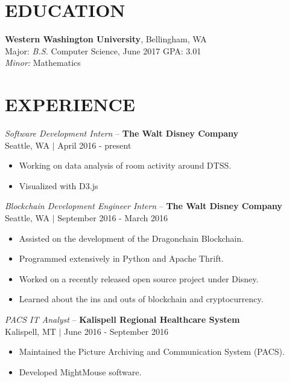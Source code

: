 \documentclass[line,margin]{res}
\begin{document}
\address{406.261.0065 $|$ alex@alex-benedetto.com $|$ github.com/wolfpack94}

\begin{resume}

\section{EDUCATION}
	{\bf Western Washington University}, Bellingham, WA \\
	Major: {\sl B.S.} Computer Science, {\small June 2017} GPA: 3.01\\
	{\sl Minor:} Mathematics
\section{EXPERIENCE}
	{\sl Software Development Intern} -- {\bf The Walt Disney Company}\\ 
	{\footnotesize Seattle, WA $|$ April 2016 - present}\\
	\begin{itemize} \itemsep -2pt
		\item Working on data analysis of room activity around DTSS.
		\item Visualized with D3.js
	\end{itemize}
	{\sl Blockchain Development Engineer Intern} -- {\bf The Walt Disney Company}\\ 
	{\footnotesize Seattle, WA $|$ September 2016 - March 2016}\\
	\begin{itemize} \itemsep -2pt
		\item Assisted on the development of the Dragonchain Blockchain.
		\item Programmed extensively in Python and Apache Thrift.
		\item Worked on a recently released open source project under Disney.
		\item Learned about the ins and outs of blockchain and cryptocurrency.
	\end{itemize}
	{\sl PACS IT Analyst} -- {\bf Kalispell Regional Healthcare System} \\
	{\footnotesize Kalispell, MT $|$ June 2016 - September 2016}\\
	\begin{itemize} \itemsep -2pt
		\item Maintained the Picture Archiving and Communication System (PACS).
		\item Developed MightMouse software.

\end{itemize}
\end{resume}
\end{document}
